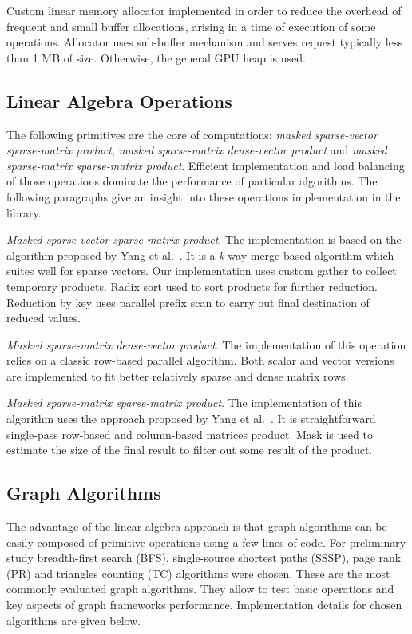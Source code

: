Custom linear memory allocator implemented in order to reduce the overhead of frequent and small buffer allocations, arising in a time of execution of some operations. Allocator uses sub-buffer mechanism and serves request typically less than 1 MB of size. Otherwise, the general GPU heap is used.

\subsection{Linear Algebra Operations}

The following primitives are the core of computations: \textit{masked sparse-vector sparse-matrix product}, \textit{masked sparse-matrix dense-vector product} and \textit{masked sparse-matrix sparse-matrix product}. Efficient implementation and load balancing of those operations dominate the performance of particular algorithms. The following paragraphs give an insight into these operations implementation in the library.

\textit{Masked sparse-vector sparse-matrix product}. The implementation is based on the algorithm proposed by Yang et al.~\cite{7284398:spvspm}. It is a \textit{k}-way merge based algorithm which suites well for sparse vectors. Our implementation uses custom gather to collect temporary products. Radix sort used to sort products for further reduction. Reduction by key uses parallel prefix scan to carry out final destination of reduced values.

\textit{Masked sparse-matrix dense-vector product}. The implementation of this operation relies on a classic row-based parallel algorithm. Both scalar and vector versions are implemented to fit better relatively sparse and dense matrix rows. 

\textit{Masked sparse-matrix sparse-matrix product}. The implementation of this algorithm uses the approach proposed by Yang et al.~\cite{yang2019graphblast}. It is straightforward single-pass row-based and column-based matrices product. Mask is used to estimate the size of the final result to filter out some result of the product. 

\subsection{Graph Algorithms}

The advantage of the linear algebra approach is that graph algorithms can be easily composed of primitive operations using a few lines of code. For preliminary study breadth-first search (BFS), single-source shortest paths (SSSP), page rank (PR) and triangles counting (TC) algorithms were chosen. These are the most commonly evaluated graph algorithms. They allow to test basic operations and key aspects of graph frameworks performance. Implementation details for chosen algorithms are given below. 

